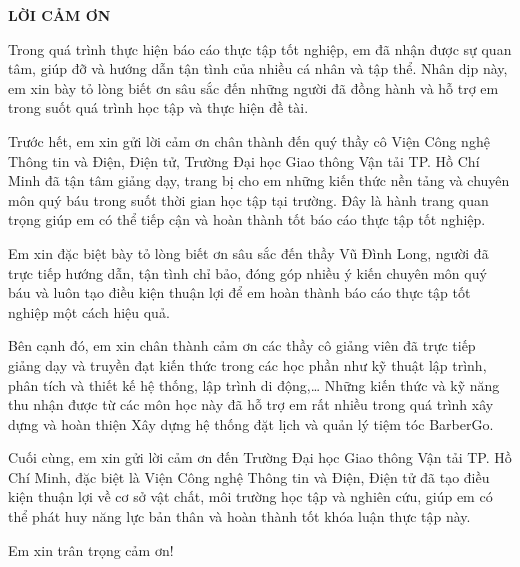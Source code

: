 \begin{center}
\textbf{\MakeUppercase{LỜI CẢM ƠN}}
\end{center}


Trong quá trình thực hiện báo cáo thực tập tốt nghiệp, em đã nhận được sự quan tâm, giúp đỡ và hướng dẫn tận tình của nhiều cá nhân và tập thể. Nhân dịp này, em xin bày tỏ lòng biết ơn sâu sắc đến những người đã đồng hành và hỗ trợ em trong suốt quá trình học tập và thực hiện đề tài.

Trước hết, em xin gửi lời cảm ơn chân thành đến quý thầy cô Viện Công nghệ Thông tin và Điện, Điện tử, Trường Đại học Giao thông Vận tải TP. Hồ Chí Minh đã tận tâm giảng dạy, trang bị cho em những kiến thức nền tảng và chuyên môn quý báu trong suốt thời gian học tập tại trường. Đây là hành trang quan trọng giúp em có thể tiếp cận và hoàn thành tốt báo cáo thực tập tốt nghiệp.

Em xin đặc biệt bày tỏ lòng biết ơn sâu sắc đến thầy Vũ Đình Long, người đã trực tiếp hướng dẫn, tận tình chỉ bảo, đóng góp nhiều ý kiến chuyên môn quý báu và luôn tạo điều kiện thuận lợi để em hoàn thành báo cáo thực tập tốt nghiệp một cách hiệu quả.

Bên cạnh đó, em xin chân thành cảm ơn các thầy cô giảng viên đã trực tiếp giảng dạy và truyền đạt kiến thức trong các học phần như kỹ thuật lập trình, phân tích và thiết kế hệ thống, lập trình di động,… Những kiến thức và kỹ năng thu nhận được từ các môn học này đã hỗ trợ em rất nhiều trong quá trình xây dựng và hoàn thiện Xây dựng hệ thống đặt lịch và quản lý tiệm tóc BarberGo.

Cuối cùng, em xin gửi lời cảm ơn đến Trường Đại học Giao thông Vận tải TP. Hồ Chí Minh, đặc biệt là Viện Công nghệ Thông tin và Điện, Điện tử đã tạo điều kiện thuận lợi về cơ sở vật chất, môi trường học tập và nghiên cứu, giúp em có thể phát huy năng lực bản thân và hoàn thành tốt khóa luận thực tập này.

Em xin trân trọng cảm ơn!

\clearpage
